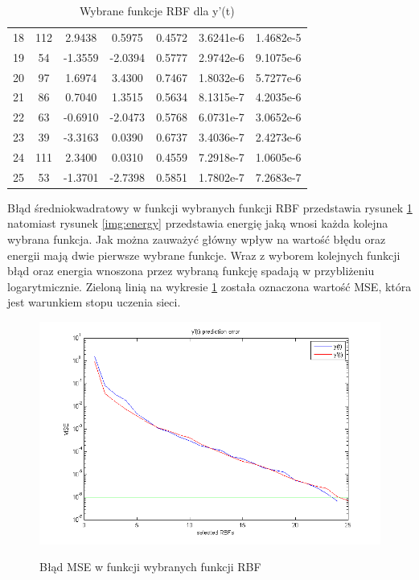 \begin{table}[ht!]
\begin{tabular}{ |c| c| c| c| c| c| c| }
   18 & 112 &   2.9438 &   0.5975  &  0.4572 &   3.6241e-6 & 1.4682e-5 \\
   19 &  54 &  -1.3559 &  -2.0394  &  0.5777 &   2.9742e-6 & 9.1075e-6 \\
   20 &  97 &   1.6974 &   3.4300  &  0.7467 &   1.8032e-6 & 5.7277e-6 \\
   21 &  86 &   0.7040 &   1.3515  &  0.5634 &   8.1315e-7 & 4.2035e-6 \\
   22 &  63 &  -0.6910 &  -2.0473  &  0.5768 &   6.0731e-7 & 3.0652e-6 \\
   23 &  39 &  -3.3163 &   0.0390  &  0.6737 &   3.4036e-7 & 2.4273e-6 \\
   24 & 111 &   2.3400 &   0.0310  &  0.4559 &   7.2918e-7 & 1.0605e-6 \\
   25 &  53 &  -1.3701 &  -2.7398  &  0.5851 &   1.7802e-7 & 7.2683e-7 \\
    \hline
\end{tabular}

\caption{Wybrane funkcje RBF dla y'(t)}
\label{tab:rbf_tabela_x2}
\end{table}

\clearpage

Błąd średniokwadratowy w funkcji wybranych funkcji RBF przedstawia rysunek \ref{img:prediction_error} natomiast rysunek \ref{img:energy} przedstawia energię jaką wnosi każda kolejna wybrana funkcja. Jak można zauważyć główny wpływ na wartość błędu oraz energii mają dwie pierwsze wybrane funkcje. Wraz z wyborem kolejnych funkcji błąd oraz energia wnoszona przez wybraną funkcję spadają w przybliżeniu logarytmicznie. Zieloną linią na wykresie \ref{img:prediction_error} została oznaczona wartość MSE, która jest warunkiem stopu uczenia sieci.

\begin{figure}[ht!]
	\centering

	{\includegraphics[width=\textwidth]
	{images/prediction_error.png}}

	\caption{Błąd MSE w funkcji wybranych funkcji RBF}
	\label{img:prediction_error}
\end{figure}


